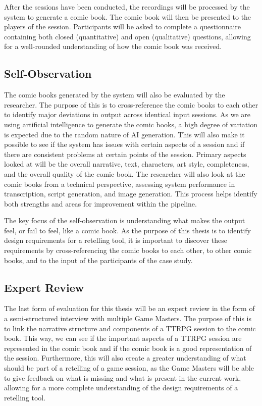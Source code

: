 After the sessions have been conducted, the recordings will be processed by the system to generate a comic book. The comic book will then be presented to the players of the session. Participants will be asked to complete a questionnaire containing both closed (quantitative) and open (qualitative) questions, allowing for a well-rounded understanding of how the comic book was received.

\subsection*{Self-Observation}
The comic books generated by the system will also be evaluated by the researcher. The purpose of this is to cross-reference the comic books to each other to identify major deviations in output across identical input sessions. As we are using artificial intelligence to generate the comic books, a high degree of variation is expected due to the random nature of AI generation. This will also make it possible to see if the system has issues with certain aspects of a session and if there are consistent problems at certain points of the session. Primary aspects looked at will be the overall narrative, text, characters, art style, completeness, and the overall quality of the comic book. The researcher will also look at the comic books from a technical perspective, assessing system performance in transcription, script generation, and image generation. This process helps identify both strengths and areas for improvement within the pipeline.

The key focus of the self-observation is understanding what makes the output feel, or fail to feel, like a comic book. As the purpose of this thesis is to identify design requirements for a retelling tool, it is important to discover these requirements by cross-referencing the comic books to each other, to other comic books, and to the input of the participants of the case study.

\subsection*{Expert Review}
The last form of evaluation for this thesis will be an expert review in the form of a semi-structured interview with multiple Game Masters. The purpose of this is to link the narrative structure and components of a TTRPG session to the comic book. This way, we can see if the important aspects of a TTRPG session are represented in the comic book and if the comic book is a good representation of the session. Furthermore, this will also create a greater understanding of what should be part of a retelling of a game session, as the Game Masters will be able to give feedback on what is missing and what is present in the current work, allowing for a more complete understanding of the design requirements of a retelling tool.

